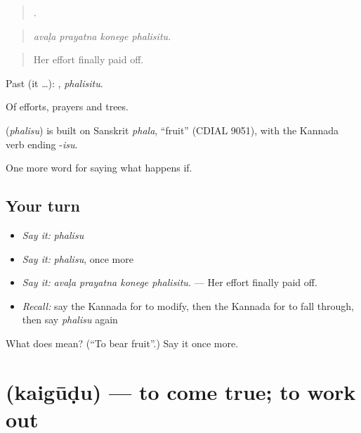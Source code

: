 \begin{quote}
   .
\end{quote}

\begin{quote}
\emph{avaḷa prayatna konege phalisitu.}
\end{quote}

\begin{quote}
Her effort finally paid off.
\end{quote}

Past (it …): , \emph{phalisitu}.

Of efforts, prayers and trees.

\begin{cousinweb}
\textbf{} (\emph{phalisu}) is built on Sanskrit \emph{phala}, \textquotedblleft{}fruit\textquotedblright{} (CDIAL 9051), with the Kannada verb ending -\emph{isu}.
\end{cousinweb}

\begin{grammarlens}[title={What you've built}]
One more word for saying what happens if.
\end{grammarlens}

\subsection*{Your turn}
\begin{itemize}
\raggedright
  \item \emph{Say it:} \emph{phalisu}
  \item \emph{Say it:} \emph{phalisu}, once more
  \item \emph{Say it:} \emph{avaḷa prayatna konege phalisitu.} — Her effort finally paid off.
  \item \emph{Recall:} say the Kannada for to modify, then the Kannada for to fall through, then say \emph{phalisu} again
\end{itemize}

\begin{tcolorbox}[breakable,colback=teal!4,colframe=teal!35!black,title={Before you move on}]
What does  mean? (\textquotedblleft{}To bear fruit\textquotedblright{}.) Say it once more.
\end{tcolorbox}
\section[\texorpdfstring{\kn{ಕೈಗೂಡು} (kaigūḍu)}{ಕೈಗೂಡು (kaigūḍu)}]{ (kaigūḍu) — to come true; to work out}

